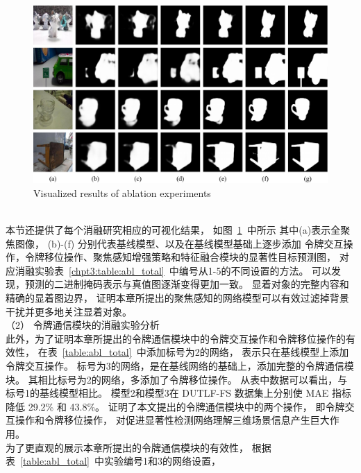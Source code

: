 \begin{figure}[t] 
	\includegraphics[width=0.99\linewidth]{figures/chapter3/self-comparsion-Use} 
	\centering
	{Visualized results of ablation experiments}
	\label{figure:self_comp}
\end{figure}
\\
%
%
%
%
\indent
本节还提供了每个消融研究相应的可视化结果，
如图~\ref{figure:self_comp}~中所示
其中(a)表示全聚焦图像，
(b)-(f) 分别代表基线模型、以及在基线模型基础上逐步添加
令牌交互操作，令牌移位操作、聚焦感知增强策略和特征融合模块的显著性目标预测图，
对应消融实验表~\ref{chpt3:table:abl_total}~中编号从1-5的不同设置的方法。
可以发现，预测的二进制掩码表示与真值图逐渐变得更加一致。 
显着对象的完整内容和精确的显着图边界，
证明本章所提出的聚焦感知的网络模型可以有效过滤掉背景干扰并更多地关注显着对象。 
\\
%
%
%
%
\indent
（2）
令牌通信模块的消融实验分析
\\
%
%
%
%
\indent
此外，为了证明本章所提出的令牌通信模块中的令牌交互操作和令牌移位操作的有效性，
在表~\ref{table:abl_total}~中添加标号为2的网络，
表示只在基线模型上添加令牌交互操作。
标号为3的网络，是在基线网络的基础上，添加完整的令牌通信模块。
其相比标号为2的网络，多添加了令牌移位操作。
从表中数据可以看出，与标号1的基线模型相比。
模型2和模型3在 DUTLF-FS 数据集上分别使 MAE 指标降低 29.2\% 和 43.8\%。 
证明了本文提出的令牌通信模块中的两个操作，
即令牌交互操作和令牌移位操作，
对促进显著性检测网络理解三维场景信息产生巨大作用。
\\
%
%
%
%
\indent
为了更直观的展示本章所提出的令牌通信模块的有效性，
根据表~\ref{table:abl_total}~中实验编号1和3的网络设置，
